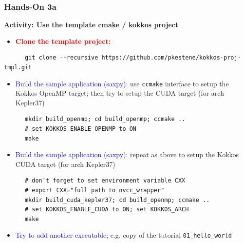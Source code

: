 \begin{frame}[fragile=singleslide]
  \frametitle{Hands-On 3a}

  {\large \bf Activity: Use the template cmake / kokkos project}

  \begin{itemize}
  \item \textcolor{red}{\bf Clone the template project:}
  \end{itemize}
  {\small
    \begin{verbatim}
      git clone --recursive https://github.com/pkestene/kokkos-proj-tmpl.git
    \end{verbatim}
  }
  \begin{itemize}
  \item \textcolor{blue}{Build the sample application (saxpy)}: use \texttt{ccmake} interface to setup the Kokkos OpenMP target; then try to setup the CUDA target (for arch Kepler37)
  \end{itemize}
  {\small
    \begin{verbatim}
      mkdir build_openmp; cd build_openmp; ccmake ..
      # set KOKKOS_ENABLE_OPENMP to ON
      make
    \end{verbatim}
  }
  \begin{itemize}
  \item \textcolor{blue}{Build the sample application (saxpy)}: repeat as above to setup the Kokkos CUDA target (for arch Kepler37)
  \end{itemize}
  {\small
    \begin{verbatim}
      # don't forget to set environment variable CXX
      # export CXX="full path to nvcc_wrapper"
      mkdir build_cuda_kepler37; cd build_openmp; ccmake ..
      # set KOKKOS_ENABLE_CUDA to ON; set KOKKOS_ARCH
      make
    \end{verbatim}
  }
  \begin{itemize}
  \item \textcolor{blue}{Try to add another executable}; e.g. copy of the tutorial \texttt{01\_hello\_world}
  \end{itemize}

\end{frame}
